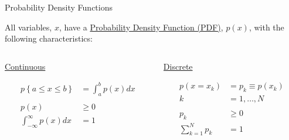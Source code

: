 \documentclass[xcolor=x11names,compress]{beamer}
\renewcommand{\(}{\begin{columns}}
\renewcommand{\)}{\end{columns}}
\newcommand{\<}[1]{\begin{column}{#1}}
\renewcommand{\>}{\end{column}}
\begin{document}
\begin{frame}{Probability Density Functions}

All variables, $x$, have a \underline{Probability Density Function (PDF)}, $p(x)$, with the following characteristics:

\begin{columns}
  \begin{column}{0.5\textwidth}
    \begin{center}
    \textcolor{berkeleygold}{\underline{Continuous}} 
    \end{center}
    \begin{align*}
    p\left\lbrace a \leq x \leq b \right\rbrace &= \int_a^b p(x)dx\\
    & \\
    p(x) & \geq 0 \\
    \int_{-\infty}^{\infty} p(x)dx &= 1
    \end{align*}
  \end{column}
  \begin{column}{0.5\textwidth}
    \begin{center}
    \textcolor{berkeleyblue}{\underline{Discrete}}  
    \end{center}
    \begin{align*}
    p(x = x_k) &= p_k \equiv p(x_k)\\
    k &= 1, \dots, N \\
    & \\
    p_k & \geq 0 \\
    \sum_{k=1}^N p_k &= 1
    \end{align*}
  \end{column}
\end{columns}

\end{frame}
\end{document}
